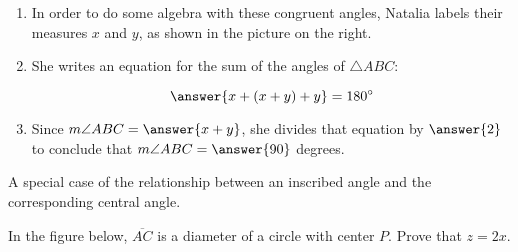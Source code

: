 \documentclass[nooutcomes]{ximera}
\begin{document}
\begin{problem}
\begin{enumerate}
\item In order to do some algebra with these congruent angles, Natalia labels their measures $x$ and $y$, as shown in the picture on the right.  

\item She writes an equation for the sum of the angles of $\triangle ABC$: 

\[
\answer{x+(x+y)+y} = 180^\circ
\]

\item Since $m\angle ABC = \answer{x+y}$, she divides that equation by $\answer{2}$ to conclude that $m\angle ABC = \answer{90}$ degrees.  

\end{enumerate}
\end{problem}


\begin{problem}
A special case of the relationship between an inscribed angle and the corresponding central angle.

In the figure below, $\overline{AC}$ is a diameter of a circle with center $P$. Prove that $z=2x$.  


\end{problem}
\end{document}
